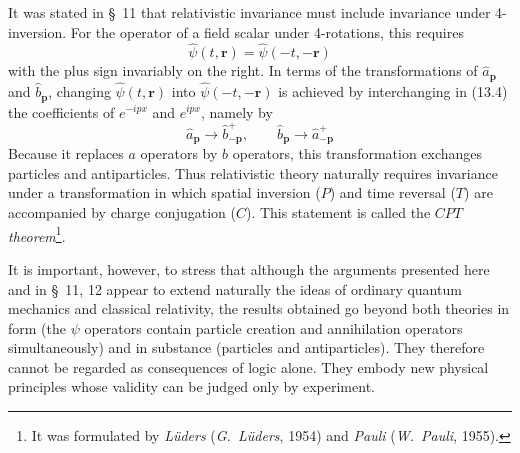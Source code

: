 It was stated in \S~11 that relativistic invariance must include invariance under 4-inversion. For the operator of a field scalar under 4-rotations, this requires
\[
\widehat\psi(t,\mathbf{r})=\widehat\psi(-t,-\mathbf{r})
\]
with the plus sign invariably on the right. In terms of the transformations of $\widehat a_{\mathbf{p}}$ and $\widehat b_{\mathbf{p}}$, changing $\widehat\psi(t,\mathbf{r})$ into $\widehat\psi(-t,-\mathbf{r})$ is achieved by interchanging in (13.4) the coefficients of $e^{-ipx}$ and $e^{ipx}$, namely by
\begin{equation}
\widehat a_{\mathbf{p}}\to\widehat b^+_{-\mathbf{p}},
\qquad
\widehat b_{\mathbf{p}}\to\widehat a^+_{-\mathbf{p}}
\tag{13.9}
\end{equation}
Because it replaces $a$ operators by $b$ operators, this transformation exchanges particles and antiparticles. Thus relativistic theory naturally requires invariance under a transformation in which spatial inversion ($P$) and time reversal ($T$) are accompanied by charge conjugation ($C$). This statement is called the $CPT$ \emph{theorem}\footnote{It was formulated by \emph{Lüders} (\emph{G.~Lüders}, 1954) and \emph{Pauli} (\emph{W.~Pauli}, 1955).}.

It is important, however, to stress that although the arguments presented here and in \S~11, 12 appear to extend naturally the ideas of ordinary quantum mechanics and classical relativity, the results obtained go beyond both theories in form (the $\psi$ operators contain particle creation and annihilation operators simultaneously) and in substance (particles and antiparticles). They therefore cannot be regarded as consequences of logic alone. They embody new physical principles whose validity can be judged only by experiment.

